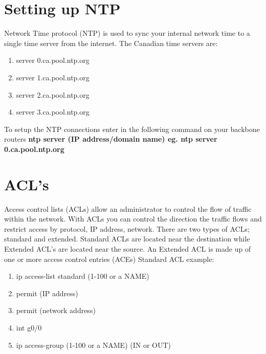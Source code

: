 \documentclass{article}
\begin{document}
\section{Setting up NTP}
Network Time protocol (NTP) is used to sync your internal network time to a single time server from the internet. The Canadian time servers are: 
\begin{enumerate}
	\item server 0.ca.pool.ntp.org
	\item server 1.ca.pool.ntp.org
	\item server 2.ca.pool.ntp.org
	\item server 3.ca.pool.ntp.org
\end{enumerate}
To setup the NTP connections enter in the following command on your backbone routers \textbf{ntp server (IP address/domain name) eg. ntp server 0.ca.pool.ntp.org}
\section{ACL's}
Access control lists (ACLs) allow an administrator to control the flow of traffic within the network. With ACLs you can control the direction the traffic flows and restrict access by protocol, IP address, network. There are two types of ACLs; standard and extended. Standard ACLs are located near the destination while Extended ACL's are located near the source. An Extended ACL is made up of one or more access control entries (ACEs)
Standard ACL example:
\begin{enumerate}
	\item ip access-list standard (1-100 or a NAME)
	\item permit (IP address)
	\item permit (network address)
	\item int g0/0
	\item ip access-group (1-100 or a NAME) (IN or OUT)
\end{enumerate}
\end{document}
